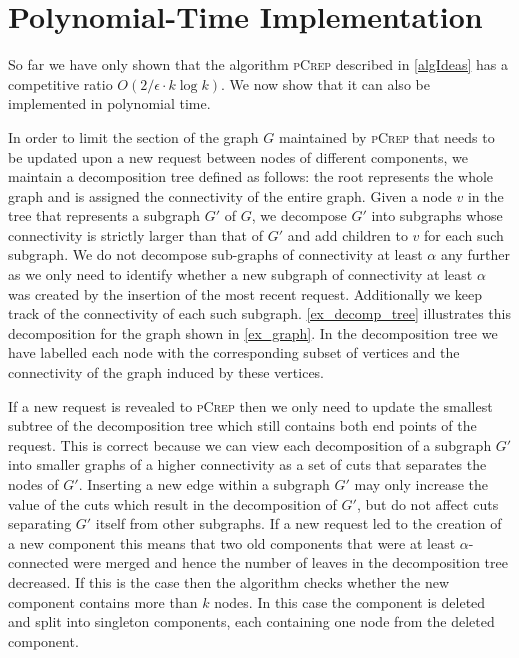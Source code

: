 \documentclass[a4paper,UKenglish,cleveref, autoref, thm-restate,authorcolumns]{lipics-v2019}
\newcommand{\adjDel}{\textsc{pCrep}}
\begin{document}
\section{Polynomial-Time Implementation}
\label{implDetSection}

So far we have only shown that the algorithm \adjDel{} described in \cref{algIdeas} has a competitive ratio $O(2/\epsilon\cdot k \log k)$. 
We now show that it can also be implemented in polynomial time. 

In order to limit the section of the graph $G$ maintained by \adjDel{} that needs to be updated upon a new request between nodes of different components, we maintain a decomposition tree defined as follows: the root represents the whole graph and is assigned the connectivity of the entire graph. Given a node $v$ in the tree that represents a subgraph $G'$ of $G$, we decompose $G'$ into subgraphs whose connectivity is strictly larger than that of $G'$ and add children to $v$ for each such subgraph. We do not decompose sub-graphs of connectivity at least $\alpha$ any further as we only need to identify whether a new subgraph of connectivity at least $\alpha$ was created by the insertion of the most recent request.
Additionally we keep track of the connectivity of each such subgraph.
\cref{ex_decomp_tree} illustrates this decomposition for the graph shown in \cref{ex_graph}. In the decomposition tree we have labelled each node with the corresponding subset of vertices and the connectivity of the graph induced by these vertices.

If a new request is revealed to \adjDel{} then we only need to update the smallest subtree of the decomposition tree which still contains both end points of the request. 
This is correct because we can view each decomposition of a subgraph $G'$ into smaller graphs of a higher connectivity as a set of cuts that separates the nodes of $G'$. Inserting a new edge within a subgraph $G'$ may only increase the value of the cuts which result in the decomposition of $G'$, but do not affect cuts separating $G'$ itself from other subgraphs.
If a new request led to the creation of a new component this means that two old components that were at least $\alpha$-connected were merged and hence the number of leaves in the decomposition tree decreased. If this is the case then the algorithm checks whether the new component contains more than $k$ nodes. In this case the component is deleted and split into singleton components, each containing one node from the deleted component.
\end{document}
